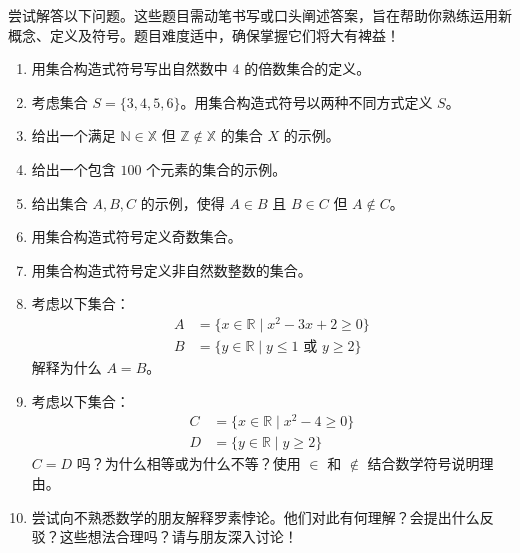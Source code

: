 尝试解答以下问题。这些题目需动笔书写或口头阐述答案，旨在帮助你熟练运用新概念、定义及符号。题目难度适中，确保掌握它们将大有裨益！

\begin{enumerate}[label=(\arabic*)]
    \item 用集合构造式符号写出自然数中 $4$ 的倍数集合的定义。
    \item 考虑集合 $S = \{3, 4, 5, 6\}$。用集合构造式符号以两种不同方式定义 $S$。
    \item 给出一个满足 $\mathbb{N} \in \mathbb{X}$ 但 $\mathbb{Z} \notin \mathbb{X}$ 的集合 $X$ 的示例。
    \item 给出一个包含 $100$ 个元素的集合的示例。
    \item 给出集合 $A, B, C$ 的示例，使得 $A \in B$ 且 $B \in C$ 但 $A \notin C$。
    \item 用集合构造式符号定义奇数集合。
    \item 用集合构造式符号定义非自然数整数的集合。
    \item 考虑以下集合：
        \begin{align*}
            A &= \{x \in \mathbb{R} \mid x^2 - 3x + 2 \ge 0\} \\
            B &= \{y \in \mathbb{R} \mid y \le 1 \text{\ 或\ } y \ge 2\}
        \end{align*}
        解释为什么 $A=B$。
    \item 考虑以下集合：
        \begin{align*}
            C &= \{x \in \mathbb{R} \mid x^2 - 4 \ge 0\} \\
            D &= \{y \in \mathbb{R} \mid y \ge 2\}
        \end{align*}
        $C = D$ 吗？为什么相等或为什么不等？使用 $\in$ 和 $\notin$ 结合数学符号说明理由。
    \item 尝试向不熟悉数学的朋友解释罗素悖论。他们对此有何理解？会提出什么反驳？这些想法合理吗？请与朋友深入讨论！
\end{enumerate}